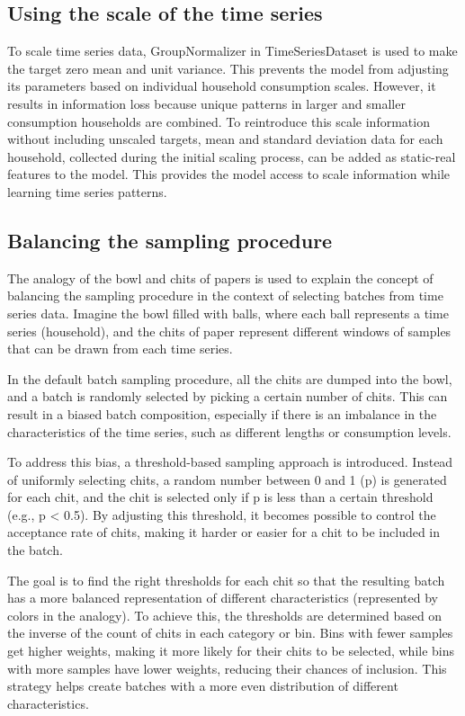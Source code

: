 \documentclass{article}
\begin{document}
\subsection{Using the scale of the time series}

To scale time series data, GroupNormalizer in TimeSeriesDataset is used to make the target zero mean and unit variance. This prevents the model from adjusting its parameters based on individual household consumption scales. However, it results in information loss because unique patterns in larger and smaller consumption households are combined. To reintroduce this scale information without including unscaled targets, mean and standard deviation data for each household, collected during the initial scaling process, can be added as static-real features to the model. This provides the model access to scale information while learning time series patterns.



\subsection{Balancing the sampling procedure}
The analogy of the bowl and chits of papers is used to explain the concept of balancing the sampling procedure in the context of selecting batches from time series data. Imagine the bowl filled with balls, where each ball represents a time series (household), and the chits of paper represent different windows of samples that can be drawn from each time series.

In the default batch sampling procedure, all the chits are dumped into the bowl, and a batch is randomly selected by picking a certain number of chits. This can result in a biased batch composition, especially if there is an imbalance in the characteristics of the time series, such as different lengths or consumption levels.

To address this bias, a threshold-based sampling approach is introduced. Instead of uniformly selecting chits, a random number between 0 and 1 (p) is generated for each chit, and the chit is selected only if p is less than a certain threshold (e.g., p < 0.5). By adjusting this threshold, it becomes possible to control the acceptance rate of chits, making it harder or easier for a chit to be included in the batch.

The goal is to find the right thresholds for each chit so that the resulting batch has a more balanced representation of different characteristics (represented by colors in the analogy). To achieve this, the thresholds are determined based on the inverse of the count of chits in each category or bin. Bins with fewer samples get higher weights, making it more likely for their chits to be selected, while bins with more samples have lower weights, reducing their chances of inclusion. This strategy helps create batches with a more even distribution of different characteristics.
\end{document}
